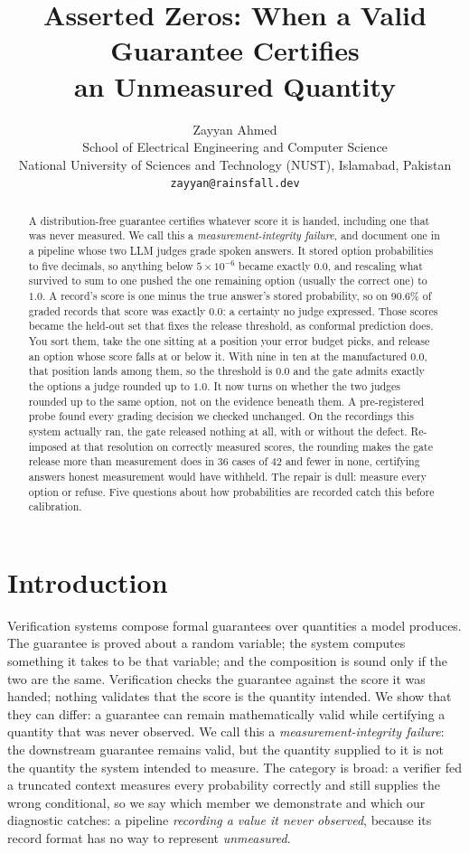 \documentclass{article}
\title{Asserted Zeros: When a Valid Guarantee Certifies\\an Unmeasured Quantity}
\author{Zayyan Ahmed\\
  School of Electrical Engineering and Computer Science\\
  National University of Sciences and Technology (NUST), Islamabad, Pakistan\\
  \texttt{zayyan@rainsfall.dev}}
\begin{document}
\maketitle

\begin{abstract}
A distribution-free guarantee certifies whatever score it is handed, including one that was never measured. We call this a \emph{measurement-integrity
failure}, and document one in a pipeline whose two LLM judges grade spoken answers.
It stored option probabilities to five decimals, so anything below
$5\times10^{-6}$ became exactly $0.0$, and rescaling what survived to sum to one
pushed the one remaining option (usually the correct one) to $1.0$. A record's
score is one minus the true answer's stored probability, so on 90.6\% of
graded records that score was exactly $0.0$: a certainty no judge expressed.
Those scores became the held-out set that fixes the release threshold, as
conformal prediction does. You sort them, take the one sitting at a position your error budget picks, and release an
option whose score falls at or below it. With nine in ten at the manufactured $0.0$, that position lands among them, so the threshold is $0.0$ and the gate admits exactly the options a judge
rounded up to $1.0$. It now turns on whether the two judges rounded up to the same option, not
on the evidence beneath them. A pre-registered probe found every grading decision we checked
unchanged. On the recordings this system actually ran, the gate released nothing
at all, with or without the defect. Re-imposed at that resolution on correctly measured scores, the
rounding makes the gate release more than measurement does in $36$ cases of $42$
and fewer in none,
certifying answers honest measurement would have withheld. The repair is dull: measure every option or refuse. Five questions about how
probabilities are recorded catch this before calibration.
\end{abstract}

\section{Introduction}\label{sec:intro}
Verification systems compose formal guarantees over quantities a model produces.
The guarantee is proved about a random variable; the system computes something it
takes to be that variable; and the composition is sound only if the two are the same. Verification
checks the guarantee against the score it was handed; nothing validates that the
score is the quantity intended. We show that they can differ: a guarantee can remain mathematically
valid while certifying a quantity that was never observed.
We call this a \emph{measurement-integrity failure}: the downstream guarantee
remains valid, but the quantity supplied to it is not the quantity the system
intended to measure. The category is broad: a verifier fed a truncated context measures every
probability correctly and still supplies the wrong conditional, so we say which member we demonstrate and which our diagnostic catches: a pipeline
\emph{recording a value it never observed}, because its record format has no way
to represent \emph{unmeasured}.
\end{document}
